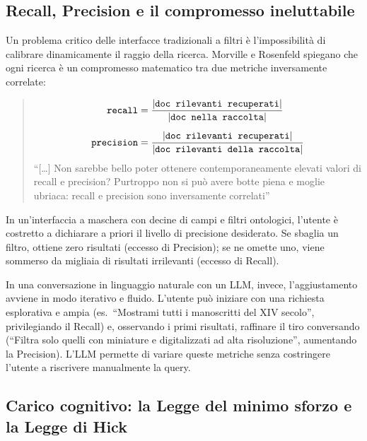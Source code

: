     \subsection{Recall, Precision e il compromesso ineluttabile}\label{subsec:recall_precision}

    Un problema critico delle interfacce tradizionali a filtri è l'impossibilità di calibrare dinamicamente il raggio della ricerca. Morville e Rosenfeld spiegano che ogni ricerca è un compromesso matematico tra due metriche inversamente correlate:

    \begin{quotation}
        \begin{align}
            \texttt{recall} &= \frac{|\texttt{doc rilevanti recuperati}|}{|\texttt{doc nella raccolta}|} \label{eq:recall}\\[5pt]
            \texttt{precision} &= \frac{|\texttt{doc rilevanti recuperati}|}{|\texttt{doc rilevanti della raccolta}|} \label{eq:precision}
        \end{align}
        ``[\ldots] Non sarebbe bello poter ottenere contemporaneamente elevati valori di recall e precision? Purtroppo non si può avere botte piena e moglie ubriaca: recall e precision sono inversamente correlati''\hfill\cite{Mor08}
    \end{quotation}

    In un'interfaccia a maschera con decine di campi e filtri ontologici, l'utente è costretto a dichiarare a priori il livello di precisione desiderato. Se sbaglia un filtro, ottiene zero risultati (eccesso di Precision); se ne omette uno, viene sommerso da migliaia di risultati irrilevanti (eccesso di Recall).

    In una conversazione in linguaggio naturale con un LLM, invece, l'aggiustamento avviene in modo iterativo e fluido. L'utente può iniziare con una richiesta esplorativa e ampia (es.\ ``Mostrami tutti i manoscritti del XIV secolo'', privilegiando il Recall) e, osservando i primi risultati, raffinare il tiro conversando (``Filtra solo quelli con miniature e digitalizzati ad alta risoluzione'', aumentando la Precision). L'LLM permette di variare queste metriche senza costringere l'utente a riscrivere manualmente la query.

    \subsection{Carico cognitivo: la Legge del minimo sforzo e la Legge di Hick}\label{subsec:cognitive_load}

